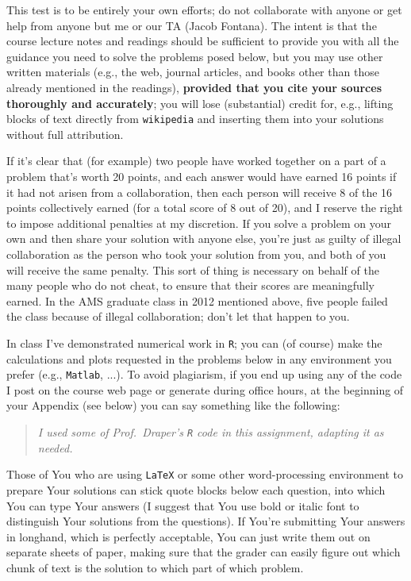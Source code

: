 \documentclass[12pt]{article}
\begin{document}
This test is to be entirely your own efforts; do not collaborate with
anyone or get help from anyone but me or our TA (Jacob Fontana). The intent is that the course lecture notes and readings should be sufficient to provide you with all the guidance you need to solve the problems posed below, but you may use other written materials (e.g., the web, journal articles, and books other than those already mentioned in the readings),
\textbf{provided that you cite your sources thoroughly and accurately}; you
will lose (substantial) credit for, e.g., lifting blocks of text directly
from \texttt{wikipedia} and inserting them into your solutions without full
attribution.

If it's clear that (for example) two people have worked together on a part
of a problem that's worth 20 points, and each answer would have earned 16
points if it had not arisen from a collaboration, then each person will
receive 8 of the 16 points collectively earned (for a total score of 8 out
of 20), and I reserve the right to impose additional penalties at my
discretion. If you solve a problem on your own and then share your solution
with anyone else, you're just as guilty of illegal collaboration as
the person who took your solution from you, and both of you will receive
the same penalty. This sort of thing is necessary on behalf of the many
people who do not cheat, to ensure that their scores are meaningfully
earned. In the AMS graduate class in 2012 mentioned above, five people failed the class because of illegal collaboration; don't let that happen to you.

In class I've demonstrated numerical work in \texttt{R}; you can (of course) make the calculations and plots requested in the problems below in any environment you prefer (e.g., \texttt{Matlab}, ...). To avoid plagiarism, if you end up using any of the code I post on the course web page or generate during office hours, at the beginning of your Appendix (see below) you can say something like the following:

\begin{quote}

\textit{I used some of Prof.~Draper's \texttt{R} code in this assignment, adapting it as needed.}

\end{quote}

Those of You who are using \texttt{LaTeX} or some other word-processing environment to prepare Your solutions can stick quote blocks below each question, into which You can type Your answers (I suggest that You use bold or italic font to distinguish Your solutions from the questions). If You're submitting Your answers in longhand, which is perfectly acceptable, You can just write them out on separate sheets of paper, making sure that the grader can easily figure out which chunk of text is the solution to which part of which problem.
\end{document}
